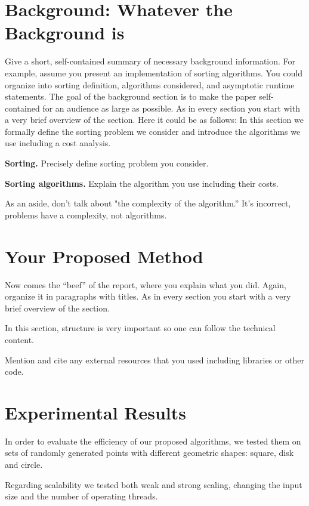 \documentclass[letterpaper]{article}
\newcommand{\mypar}[1]{{\bf #1.}}
\begin{document}
\section{Background: Whatever the Background is}\label{sec:background}

Give a short, self-contained summary of necessary
background information. For example, assume you present an
implementation of sorting algorithms. You could organize into sorting
definition, algorithms considered, and asymptotic runtime statements. The goal of the
background section is to make the paper self-contained for an audience
as large as possible. As in every section
you start with a very brief overview of the section. Here it could be as follows: In this section 
we formally define the sorting problem we consider and introduce the algorithms we use
including a cost analysis.

\mypar{Sorting}
Precisely define sorting problem you consider.

\mypar{Sorting algorithms}
Explain the algorithm you use including their costs.

As an aside, don't talk about "the complexity of the algorithm.'' It's incorrect,
problems have a complexity, not algorithms.


\section{Your Proposed Method}\label{sec:yourmethod}

Now comes the ``beef'' of the report, where you explain what you
did. Again, organize it in paragraphs with titles. As in every section
you start with a very brief overview of the section.

In this section, structure is very important so one can follow the technical content.

Mention and cite any external resources that you used including libraries or other code.

\section{Experimental Results}\label{sec:exp}

In order to evaluate the efficiency of our proposed algorithms, we tested them on sets of randomly generated points with different geometric shapes: square, disk and circle.

Regarding scalability we tested both weak and strong scaling, changing the input size and the number of operating threads.
\end{document}
